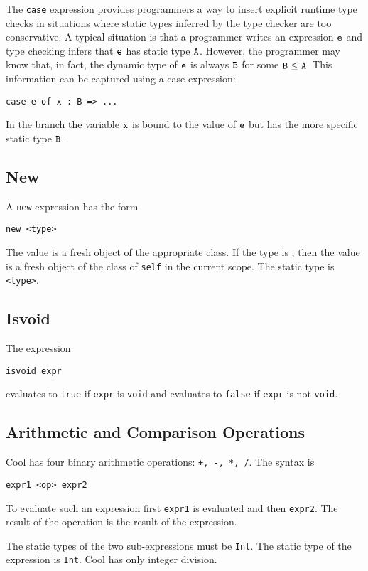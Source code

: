 The {\tt case} expression provides programmers a way to insert explicit
runtime type checks in situations where static types inferred by
the type checker are too conservative.  A typical
situation is that a programmer writes an expression $\tt e$ and type
checking infers that $\tt e$ has static type $\tt A$.  However, the programmer
may know that, in fact, the dynamic type of $\tt e$ is always $\tt B$ for
some $\tt B \leq A$.  This information can be captured
using a case expression:
\begin{verbatim}
case e of x : B => ...
\end{verbatim}
In the branch the variable $\tt x$ is bound to the value of $\tt e$ but
has the more specific static type $\tt B$.

\subsection{New}
A {\tt new} expression has the form
\begin{verbatim}
new <type> 
\end{verbatim}
The value is a fresh object of the appropriate class.
If the type is \styp, then the value is a fresh object of the
class of {\tt self} in the current scope.
The static type is {\tt <type>}.


\subsection{Isvoid}
\label{sec-isvoid}

The expression
\begin{verbatim}
isvoid expr
\end{verbatim}
evaluates to {\tt true} if {\tt expr} is {\tt void} and evaluates
to {\tt false} if {\tt expr} is not {\tt void}.


\subsection{Arithmetic and Comparison Operations}

Cool has four binary arithmetic operations: {\tt +, -, *, /}.
The syntax is
\begin{verbatim}
expr1 <op> expr2
\end{verbatim}
To evaluate such an expression first {\tt expr1} is evaluated and
then {\tt expr2}.  The result of the operation is the result of the
expression.

The static types of the two sub-expressions must be {\tt Int}.
The static type of the expression is {\tt Int}.
Cool has only integer division.

